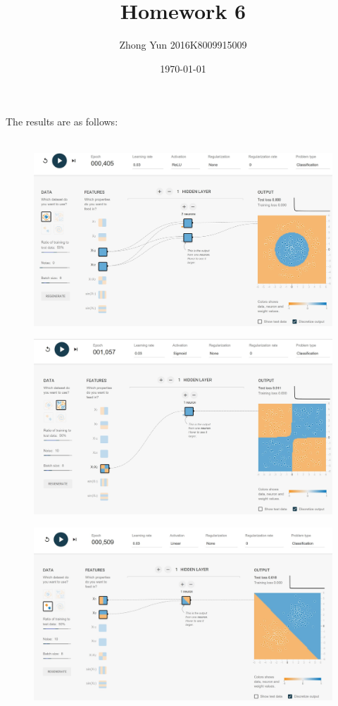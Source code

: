 \documentclass{article} %
\title{Homework 6}
\author{Zhong Yun 2016K8009915009}
\date{\today}
\begin{document}
\maketitle

The results are as follows:
\\
\\
  \begin{figure}[H]
        \center
        \caption{}\label{}
        \includegraphics[width=1\textwidth]{1.JPG}
    \end{figure}

    \begin{figure}[H]
        \center
        \caption{}\label{}
        \includegraphics[width=1\textwidth]{2.JPG}
    \end{figure}

    \begin{figure}[H]
        \center
        \caption{}\label{}
        \includegraphics[width=1\textwidth]{3.JPG}
    \end{figure}
\end{document}

